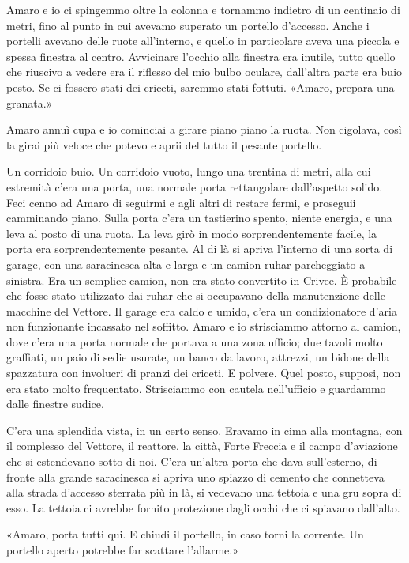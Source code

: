 Amaro e io ci spingemmo oltre la colonna e tornammo indietro di un
centinaio di metri, fino al punto in cui avevamo superato un portello
d'accesso. Anche i portelli avevano delle ruote all'interno, e quello in
particolare aveva una piccola e spessa finestra al centro. Avvicinare
l'occhio alla finestra era inutile, tutto quello che riuscivo a vedere
era il riflesso del mio bulbo oculare, dall'altra parte era buio pesto.
Se ci fossero stati dei criceti, saremmo stati fottuti. «Amaro, prepara
una granata.»

Amaro annuì cupa e io cominciai a girare piano piano la ruota. Non
cigolava, così la girai più veloce che potevo e aprii del tutto il
pesante portello.

Un corridoio buio. Un corridoio vuoto, lungo una trentina di metri, alla
cui estremità c'era una porta, una normale porta rettangolare
dall'aspetto solido. Feci cenno ad Amaro di seguirmi e agli altri di
restare fermi, e proseguii camminando piano. Sulla porta c'era un
tastierino spento, niente energia, e una leva al posto di una ruota. La
leva girò in modo sorprendentemente facile, la porta era
sorprendentemente pesante. Al di là si apriva l'interno di una sorta di
garage, con una saracinesca alta e larga e un camion ruhar parcheggiato
a sinistra. Era un semplice camion, non era stato convertito in Crivee.
È probabile che fosse stato utilizzato dai ruhar che si occupavano della
manutenzione delle macchine del Vettore. Il garage era caldo e umido,
c'era un condizionatore d'aria non funzionante incassato nel soffitto.
Amaro e io strisciammo attorno al camion, dove c'era una porta normale
che portava a una zona ufficio; due tavoli molto graffiati, un paio di
sedie usurate, un banco da lavoro, attrezzi, un bidone della spazzatura
con involucri di pranzi dei criceti. E polvere. Quel posto, supposi, non
era stato molto frequentato. Strisciammo con cautela nell'ufficio e
guardammo dalle finestre sudice.

C'era una splendida vista, in un certo senso. Eravamo in cima alla
montagna, con il complesso del Vettore, il reattore, la città, Forte
Freccia e il campo d'aviazione che si estendevano sotto di noi. C'era
un'altra porta che dava sull'esterno, di fronte alla grande saracinesca
si apriva uno spiazzo di cemento che connetteva alla strada d'accesso
sterrata più in là, si vedevano una tettoia e una gru sopra di esso. La
tettoia ci avrebbe fornito protezione dagli occhi che ci spiavano
dall'alto.

«Amaro, porta tutti qui. E chiudi il portello, in caso torni la
corrente. Un portello aperto potrebbe far scattare l'allarme.»

